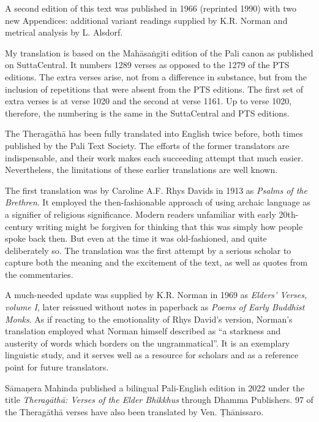 \documentclass[12pt,openany]{book}%
\begin{document}
A second edition of this text was published in 1966 (reprinted 1990) with two new Appendices: additional variant readings supplied by K.R. Norman and metrical analysis by L. Alsdorf.

My translation is based on the \textsanskrit{Mahāsaṅgīti} edition of the Pali canon as published on SuttaCentral. It numbers 1289 verses as opposed to the 1279 of the PTS editions. The extra verses arise, not from a difference in substance, but from the inclusion of repetitions that were absent from the PTS editions. The first set of extra verses is at verse 1020 and the second at verse 1161. Up to verse 1020, therefore, the numbering is the same in the SuttaCentral and PTS editions.

The \textsanskrit{Theragāthā} has been fully translated into English twice before, both times published by the Pali Text Society. The efforts of the former translators are indispensable, and their work makes each succeeding attempt that much easier. Nevertheless, the limitations of these earlier translations are well known.

The first translation was by Caroline A.F. Rhys Davids in 1913 as \textit{Psalms of the Brethren}. It employed the then-fashionable approach of using archaic language as a signifier of religious significance. Modern readers unfamiliar with early 20th-century writing might be forgiven for thinking that this was simply how people spoke back then. But even at the time it was old-fashioned, and quite deliberately so. The translation was the first attempt by a serious scholar to capture both the meaning and the excitement of the text, as well as quotes from the commentaries.

A much-needed update was supplied by K.R. Norman in 1969 as \textit{Elders’ Verses, volume I}, later reissued without notes in paperback as \textit{Poems of Early Buddhist Monks}. As if reacting to the emotionality of Rhys David’s version, Norman’s translation employed what Norman himself described as “a starkness and austerity of words which borders on the ungrammatical”. It is an exemplary linguistic study, and it serves well as a resource for scholars and as a reference point for future translators.

\textsanskrit{Sāmaṇera} Mahinda published a bilingual Pali-English edition in 2022 under the title \textit{\textsanskrit{Theragāthā}: Verses of the Elder Bhikkhus} through Dhamma Publishers. 97 of the \textsanskrit{Theragāthā} verses have also been translated by Ven. \textsanskrit{Ṭhānissaro}.
\end{document}
